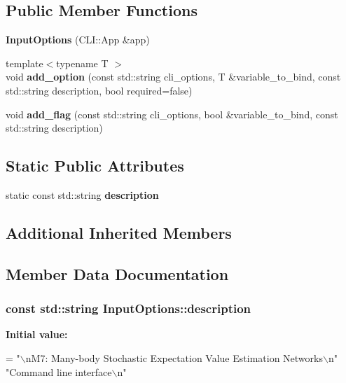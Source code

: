 \subsection*{Public Member Functions}
\begin{DoxyCompactItemize}
\item 
{\bfseries Input\+Options} (C\+L\+I\+::\+App \&app)\hypertarget{classInputOptions_aa0da48b6508d4feb72d791281ec3b83d}{}\label{classInputOptions_aa0da48b6508d4feb72d791281ec3b83d}

\item 
{\footnotesize template$<$typename T $>$ }\\void {\bfseries add\+\_\+option} (const std\+::string cli\+\_\+options, T \&variable\+\_\+to\+\_\+bind, const std\+::string description, bool required=false)\hypertarget{classInputOptions_a0fe71bbd7d46ce5c66e1b50edf23b1dc}{}\label{classInputOptions_a0fe71bbd7d46ce5c66e1b50edf23b1dc}

\item 
void {\bfseries add\+\_\+flag} (const std\+::string cli\+\_\+options, bool \&variable\+\_\+to\+\_\+bind, const std\+::string description)\hypertarget{classInputOptions_a99a304a717c59b9f3ce222d820316883}{}\label{classInputOptions_a99a304a717c59b9f3ce222d820316883}

\end{DoxyCompactItemize}
\subsection*{Static Public Attributes}
\begin{DoxyCompactItemize}
\item 
static const std\+::string {\bfseries description}
\end{DoxyCompactItemize}
\subsection*{Additional Inherited Members}


\subsection{Member Data Documentation}
\subsubsection[{\texorpdfstring{description}{description}}]{\setlength{\rightskip}{0pt plus 5cm}const std\+::string Input\+Options\+::description\hspace{0.3cm}{\ttfamily [static]}}\hypertarget{classInputOptions_a30ba494bd9097575389cc5133f33c5f6}{}\label{classInputOptions_a30ba494bd9097575389cc5133f33c5f6}
{\bfseries Initial value\+:}
\begin{DoxyCode}
=
        \textcolor{stringliteral}{"\(\backslash\)nM7: Many-body Stochastic Expectation Value Estimation Networks\(\backslash\)n"}
        \textcolor{stringliteral}{"Command line interface\(\backslash\)n"}
\end{DoxyCode}


